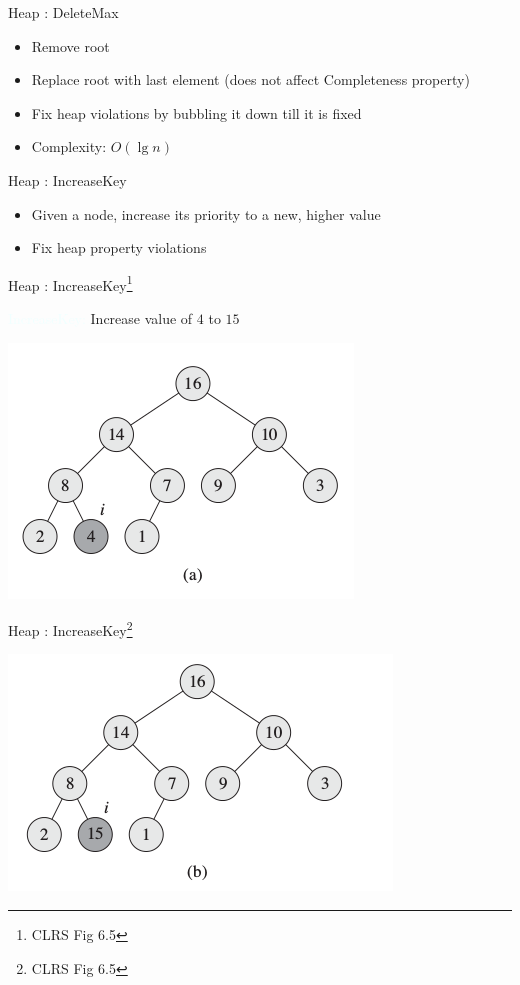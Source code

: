 \documentclass{beamer}
\newcommand{\tblue}[1]{{\Large {\textcolor{azure}{#1}}}}
\begin{document}
\begin{frame}{Heap : DeleteMax}
    \begin{itemize}
        \item Remove root
        \item Replace root with last element (does not affect Completeness property)
        \item Fix heap violations by bubbling it down till it is fixed
        \item Complexity: \pause $O(\lg n)$
    \end{itemize}
\end{frame}


\begin{frame}{Heap : IncreaseKey}
    \begin{itemize}
        \item Given a node, increase its priority to a new, higher value
        \item Fix heap property violations 
    \end{itemize}
\end{frame}


\begin{frame}{Heap : IncreaseKey\footnote{CLRS Fig 6.5}}

\tblue{IncreaseKey:} Increase value of $4$ to $15$
    \begin{center}
        \includegraphics[scale=0.5]{heapIncreaseKey1.png}
    \end{center}
\end{frame}


\begin{frame}{Heap : IncreaseKey\footnote{CLRS Fig 6.5}}
    \begin{center}
        \includegraphics[scale=0.5]{heapIncreaseKey2.png}
    \end{center}
\end{frame}
\end{document}

